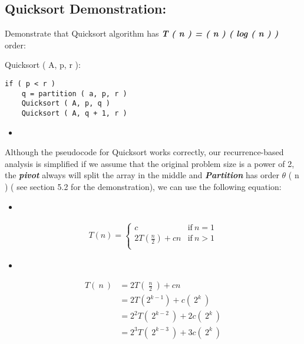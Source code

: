 \subsection{Quicksort Demonstration:}

Demonstrate that Quicksort algorithm has {\bfseries\itshape T ( n ) = ( n ) ( log ( n ) )} order:  \hfill \break

{\bfseries\color{Violet}{function}} Quicksort ( A, p, r ):
\begin{lstlisting}
if ( p < r )
	q = partition ( a, p, r )
	Quicksort ( A, p, q )
	Quicksort ( A, q + 1, r )
\end{lstlisting}

\begin{itemize}
\item {\bfseries\itshape\color{Maroon}{Demonstration:}} \hfill
\end{itemize}

Although the pseudocode for Quicksort works correctly, our recurrence-based analysis is simplified if we assume that the original problem size is a power of 2, the {\bfseries\itshape pivot} always will split the array in the middle and {\bfseries\itshape Partition} has order {$\theta$ ( n )} ( see section 5.2 for the demonstration), we can use the following equation: \hfill \break

\begin{itemize}
\item {\bfseries\itshape\color{Violet}{Quicksort recurrence equation:}}
\end{itemize} \hfill

\begin{ceqn}
\begin{align}
T( n ) = \left\{
\begin{array}{ll}
c & \mathrm {if\ } n = 1 \\
2T ( \frac{n}{2} ) + cn & \mathrm {if\ } n > 1 \\
\end{array}
\right.
\end{align}
\end{ceqn} \hfill

\begin{itemize}
\item {\bfseries\itshape{}}
\end{itemize} \hfill

\begin{ceqn}
\begin{align}
T (\ n\ ) &= 2T (\ \frac{n}{2}\ ) + cn \\
&= 2T ( 2^{k-1} ) + c(\ 2^{k}\ ) \\
&= 2^{2}T (\ 2^{k-2}\ ) + 2c(\ 2^{k}\ ) \\
&= 2^{3}T (\ 2^{k-3}\ ) + 3c(\ 2^{k}\ ) \\
\end{align}
\end{ceqn} \hfill

